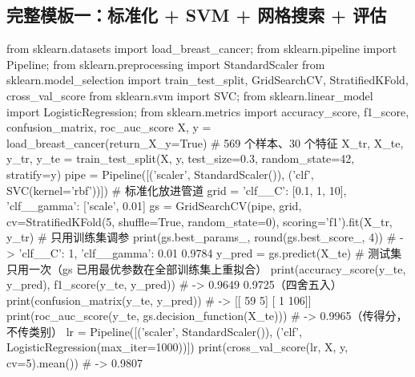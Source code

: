 \subsection{完整模板一：标准化 + SVM + 网格搜索 + 评估}
\begin{PYQcode}
from sklearn.datasets import load_breast_cancer; from sklearn.pipeline import Pipeline; from sklearn.preprocessing import StandardScaler
from sklearn.model_selection import train_test_split, GridSearchCV, StratifiedKFold, cross_val_score
from sklearn.svm import SVC; from sklearn.linear_model import LogisticRegression; from sklearn.metrics import accuracy_score, f1_score, confusion_matrix, roc_auc_score
X, y = load_breast_cancer(return_X_y=True)                    # 569 个样本、30 个特征
X_tr, X_te, y_tr, y_te = train_test_split(X, y, test_size=0.3, random_state=42, stratify=y)
pipe = Pipeline([('scaler', StandardScaler()), ('clf', SVC(kernel='rbf'))])     # 标准化放进管道
grid = {'clf__C': [0.1, 1, 10], 'clf__gamma': ['scale', 0.01]}
gs = GridSearchCV(pipe, grid, cv=StratifiedKFold(5, shuffle=True, random_state=0), scoring='f1').fit(X_tr, y_tr)  # 只用训练集调参
print(gs.best_params_, round(gs.best_score_, 4))               # -> {'clf__C': 1, 'clf__gamma': 0.01} 0.9784
y_pred = gs.predict(X_te)                                      # 测试集只用一次（gs 已用最优参数在全部训练集上重拟合）
print(accuracy_score(y_te, y_pred), f1_score(y_te, y_pred))   # -> 0.9649 0.9725（四舍五入）
print(confusion_matrix(y_te, y_pred))                          # -> [[ 59   5] [  1 106]]
print(roc_auc_score(y_te, gs.decision_function(X_te)))         # -> 0.9965（传得分，不传类别）
lr = Pipeline([('scaler', StandardScaler()), ('clf', LogisticRegression(max_iter=1000))])
print(cross_val_score(lr, X, y, cv=5).mean())                  # -> 0.9807
\end{PYQcode}

